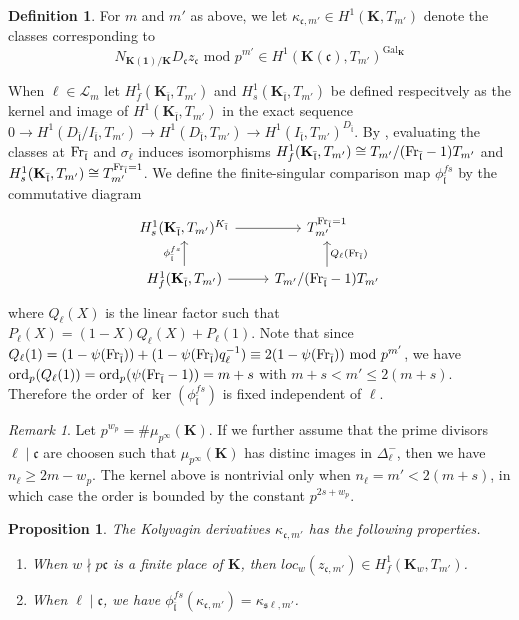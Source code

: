 \documentclass[leqno]{amsart}
\newtheorem{prop}[thm]{Proposition}
\theoremstyle{definition}
\newtheorem{defn}[thm]{Definition}
\theoremstyle{remark}
\newtheorem{rem}[thm]{Remark}
\newcommand{\id}{\mathbf{1}}
\DeclareMathOperator{\Gal}{Gal}
\newcommand{\Fr}{\textnormal{Fr}} %
\newcommand{\fc}{\mathfrak{c}}
\newcommand{\fs}{\mathfrak{s}}
\newcommand{\fl}{\mathfrak{l}}
\newcommand{\K}{{\mathbf{K}}} %
\newcommand{\flw}{\bar{\fl}}
\newcommand{\rk}[1]{\K({#1})} %
\newcommand{\ord}{\textnormal{ord}} %
\begin{document}
\begin{defn}
For $m$ and  $m'$ as above, 
we let $\kappa_{\fc,m'}\in H^1(\K,T_{m'})$
denote the classes corresponding to 
\[
	N_{\rk{\id}/\K}D_{\fc}z_{\fc}
	\text{ mod }p^{m'} \in 
	H^1(\rk{\fc}, T_{m'})^{\Gal_\K}
\]
\end{defn}
When $\ell\in \mathcal{L}_m$
let $H^1_f(\K_{\flw},T_{m'})$ and
$H^1_s(\K_{\flw},T_{m'})$ be defined respecitvely
as the kernel and image of $H^1(\K_{\flw},T_{m'})$ 
in the exact sequence 
$0\to H^1(D_{\flw}/I_{\flw},T_{m'})
\to H^1(D_{\flw},T_{m'})
\to H^1(I_{\flw},T_{m'})^{D_{\flw}}$.
By \cite[Lem 1.4.7]{Rubin},
evaluating the classes at
$\Fr_{\flw}$ and $\sigma_\ell$ induces isomorphisms
$H^1_f(\K_{\flw},T_{m'})\cong T_{m'}/(\Fr_{\flw}-1)T_{m'}$
and
$H^1_s(\K_{\flw},T_{m'})\cong T_{m'}^{\Fr_{\flw}=1}$.
We define the finite-singular comparison map
$\phi_{\flw}^{fs}$ by the commutative diagram
\[
	\begin{tikzcd}
		H^1_s(\K_{\flw}, T_{m'})^{K_{\flw}} \arrow[r]&
		T_{m'}^{\Fr_{\flw}=1}\\
		H^1_{f}(\K_{\flw}, T_{m'}) \arrow[r]
		\arrow[u,"\phi_{\flw}^{fs}"]&
		T_{m'}/(\Fr_{\flw}-1)T_{m'}
		\arrow[u,"Q_\ell(\Fr_{\flw})",swap]
	\end{tikzcd}
\]
where $Q_\ell(X)$ is the linear factor  such that 
$P_\ell(X)=(1-X)Q_\ell(X)+P_\ell(1)$.
Note that since
$Q_\ell(1)=
(1-\psi(\Fr_{\flw}))+(1-\psi(\Fr_{\flw})q_\ell^{-1})
\equiv 2(1-\psi(\Fr_{\flw})) \text{ mod }p^{m'}$,
we have $\ord_p(Q_\ell(1))=\ord_p(\psi(\Fr_{\flw}-1))
=m+s$ with 
$m+s< m'\leq 2(m+s)$.
Therefore
the order of $\ker(\phi_{\flw}^{fs})$
is fixed independent of $\ell$.
\begin{rem}
Let $p^{w_p}=\#\mu_{p^\infty}(\K)$.
If we further assume that the prime divisors
$\ell\mid\fc$ are choosen such that
$\mu_{p^\infty}(\K)$ has distinc images in $\Delta_\ell^-$,
then we have  $n_\ell\geq 2m-w_p$.
The kernel above is nontrivial only when 
$n_\ell=m'<2(m+s)$, in which case the order 
is bounded by the constant $p^{2s+w_p}$.
\end{rem}


\begin{prop}
The Kolyvagin derivatives
$\kappa_{\fc,m'}$ has the following properties.
\begin{enumerate}[label=(\alph*)]
\item When $w\nmid p\fc$ is a finite place of  $\K$,
then  $loc_w(z_{\fc,m'})\in H^1_f(\K_w,T_{m'})$.
\item When $\ell\mid\fc$, we have
$\phi_{\flw}^{fs}(\kappa_{\fc,m'})=\kappa_{\fs\ell,m'}$.
\end{enumerate}
\end{prop}
\end{document}
